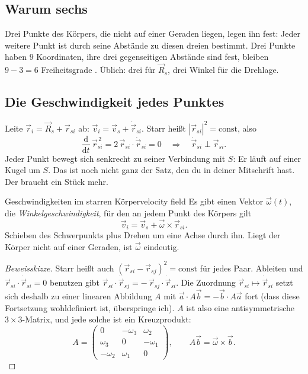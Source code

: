 \documentclass[deutsch]{kaelearn}
\newcommand\dd{\mathrm{d}}
\begin{document}
\subsection{Warum sechs}
Drei Punkte des Körpers, die nicht auf einer Geraden liegen, legen ihn fest: Jeder weitere Punkt ist durch seine Abstände zu diesen
dreien bestimmt. Drei Punkte haben $9$ Koordinaten, ihre drei gegenseitigen Abstände sind fest, bleiben $9-3 = 6$ Freiheitsgrade
. Üblich: drei für $\vec R_s$, drei Winkel für die Drehlage.

\subsection{Die Geschwindigkeit jedes Punktes}
Leite $\vec r_i = \vec R_s + \vec r_{si}$ ab: $\vec v_i = \vec v_s + \dot{\vec r}_{si}$. Starr heißt $|\vec r_{si}|^2 = \text{const}$, also
\[
  \frac{\dd}{\dd t}\,\vec r_{si}^{\,2} = 2\,\vec r_{si}\cdot\dot{\vec r}_{si} = 0 \quad\Longrightarrow\quad \dot{\vec r}_{si}\perp\vec r_{si}.
\]
Jeder Punkt bewegt sich senkrecht zu seiner Verbindung mit $S$: Er läuft auf einer Kugel um $S$. Das ist noch nicht ganz der Satz,
den du in deiner Mitschrift hast. Der braucht ein Stück mehr.

\begin{theorem}{Geschwindigkeiten im starren Körper}{velocity field}
Es gibt einen Vektor $\vec\omega(t)$, die \emph{Winkelgeschwindigkeit}, für den an jedem Punkt des Körpers gilt
\[
  \vec v_i = \vec v_s + \vec\omega\times\vec r_{si}.
\]
Schieben des Schwerpunkts plus Drehen um eine Achse durch ihn. Liegt der Körper nicht auf einer Geraden, ist $\vec\omega$ eindeutig.
\end{theorem}

\begin{proof}[Beweisskizze]
Starr heißt auch $(\vec r_{si}-\vec r_{sj})^2 = \text{const}$ für jedes Paar. Ableiten und $\vec r_{si}\cdot\dot{\vec r}_{si} = 0$
benutzen gibt $\vec r_{si}\cdot\dot{\vec r}_{sj} = -\,\vec r_{sj}\cdot\dot{\vec r}_{si}$. Die Zuordnung $\vec r_{si}\mapsto\dot{\vec r}_{si}$
setzt sich deshalb zu einer linearen Abbildung $A$ mit $\vec a\cdot A\vec b = -\vec b\cdot A\vec a$ fort (dass diese Fortsetzung
wohldefiniert ist, überspringe ich). $A$ ist also eine antisymmetrische $3\times3$-Matrix, und jede solche ist ein Kreuzprodukt:
\[
  A = \begin{pmatrix}0&-\omega_3&\omega_2\\ \omega_3&0&-\omega_1\\ -\omega_2&\omega_1&0\end{pmatrix},\qquad A\vec b = \vec\omega\times\vec b .
\]
\end{proof}
\end{document}
